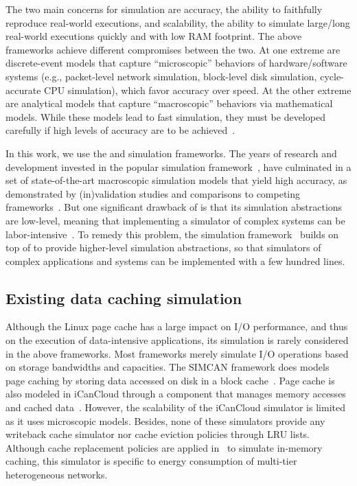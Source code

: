 The two main concerns for simulation are accuracy,
the ability to faithfully reproduce real-world executions, and
scalability, the ability to simulate large/long real-world
executions quickly and with low RAM footprint. The above
frameworks achieve different compromises between the two.  At
one extreme are discrete-event models that capture
``microscopic'' behaviors of hardware/software systems (e.g.,
packet-level network simulation, block-level disk simulation,
cycle-accurate CPU simulation), which favor accuracy over
speed.  At the other extreme are analytical models that capture
``macroscopic'' behaviors via mathematical models.  While these
models lead to fast simulation, they must be developed
carefully if high levels of accuracy are to be
achieved~\cite{velhoTOMACS2013}. 

In this  work, we use the \simgrid and \wrench simulation
frameworks.  The years of research and development invested in
the popular \simgrid simulation framework~\cite{casanova2014simgrid}, have
culminated in a set of state-of-the-art macroscopic simulation
models that yield high accuracy, as demonstrated by
(in)validation studies and comparisons to competing
frameworks~\cite{smpi_validity, velhoTOMACS2013, simutool_09,
nstools_07, lebre2015, pouilloux:hal-01197274,
smpi_tpds2017,  7885814, 8048921, 7384330}.  But one
significant drawback of \simgrid is that its simulation
abstractions are low-level, meaning that implementing a
simulator of complex systems can be
labor-intensive~\cite{kecskemeti_2014}. To remedy this problem,
the \wrench simulation framework~\cite{casanova2020fgcs}
builds on top of \simgrid to provide higher-level simulation
abstractions, so that simulators of complex applications and
systems can be implemented with a few hundred lines.

\subsection{Existing data caching simulation}

Although the Linux page cache has a large impact on I/O
performance, and thus on the execution of data-intensive
applications, its simulation is rarely considered in the above
frameworks.  Most frameworks merely simulate I/O operations
based on storage bandwidths and capacities.  The SIMCAN
framework does models page caching by storing data accessed on
disk in a block cache~\cite{nunez2012simcan}.  Page cache is
also modeled in iCanCloud through a component that manages
memory accesses and cached data~\cite{nunez2012icancloud}.
However, the scalability of the iCanCloud simulator is limited
as it uses microscopic models.  Besides, none
of these simulators provide any writeback cache simulator nor
cache eviction policies through LRU lists.  Although cache
replacement policies are applied in~\cite{xu2018saving} to
simulate in-memory caching, this simulator is specific to
energy consumption of multi-tier heterogeneous networks.


